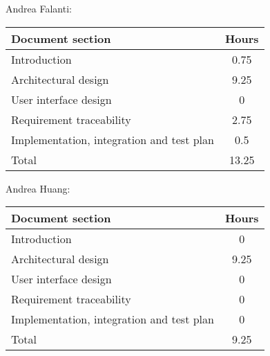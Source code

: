 Andrea Falanti:

\begin{tabular}{|l|c|}
    \hline
    Document section & Hours \\
    \hline
     Introduction & 0.75\\
     Architectural design & 9.25\\
     User interface design & 0\\
     Requirement traceability & 2.75\\
     Implementation, integration and test plan & 0.5\\
     \hline
     Total & 13.25\\
     \hline
\end{tabular}
\vskip 0.3in

Andrea Huang:

\begin{tabular}{|l|c|}
    \hline
    Document section & Hours \\
    \hline
     Introduction & 0\\
     Architectural design & 9.25\\
     User interface design & 0\\
     Requirement traceability & 0\\
     Implementation, integration and test plan & 0\\
     \hline
     Total & 9.25\\
     \hline
\end{tabular}